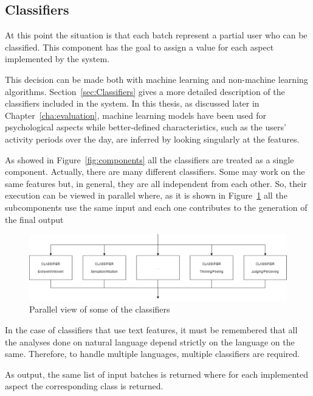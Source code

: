 \subsection{Classifiers}
At this point the situation is that each batch represent a partial user who can be classified. 
This component has the goal to assign a value for each aspect implemented by the system.

This decision can be made both with machine learning and non-machine learning algorithms. Section~\ref{sec:Classifiers} gives a more detailed description of the classifiers included in the system.
In this thesis, as discussed later in Chapter~\ref{cha:evaluation}, machine learning models have been used for psychological aspects while better-defined characteristics, such as the users' activity periods over the day, are inferred by looking singularly at the features.

As showed in Figure~\ref{fig:components} all the classifiers are treated as a single component. Actually, there are many different classifiers.
Some may work on the same features but, in general, they are all independent from each other.
So, their execution can be viewed in parallel where, as it is shown in Figure~\ref{fig:classifiers} all the subcomponents use the same input and each one contributes to the generation of the final output

\begin{figure}[htp]
    \centering
    \includegraphics[width=%
    1.0\textwidth,keepaspectratio]{img/classifiers}
    \caption{Parallel view of some of the classifiers}
    \label{fig:classifiers}
\end{figure}

In the case of classifiers that use text features, it must be remembered that all the analyses done on natural language depend strictly on the language on the same.
Therefore, to handle multiple languages, multiple classifiers are required.

As output, the same list of input batches is returned where for each implemented aspect the corresponding class is returned.

